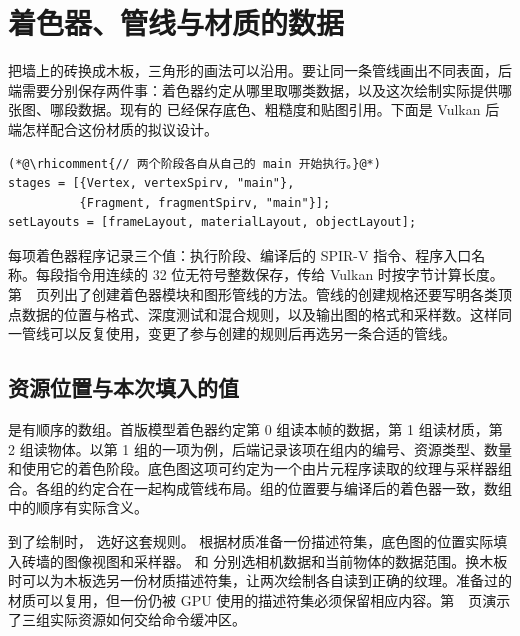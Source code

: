 \clearpage
\section{着色器、管线与材质的数据}\label{sec:data-pipeline}
把墙上的砖换成木板，三角形的画法可以沿用。要让同一条管线画出不同表面，后端需要分别保存两件事：着色器约定从哪里取哪类数据，以及这次绘制实际提供哪张图、哪段数据。现有的  已经保存底色、粗糙度和贴图引用。下面是 Vulkan 后端怎样配合这份材质的拟议设计。

\begin{lstlisting}
(*@\rhicomment{// 两个阶段各自从自己的 main 开始执行。}@*)
stages = [{Vertex, vertexSpirv, "main"},
          {Fragment, fragmentSpirv, "main"}];
setLayouts = [frameLayout, materialLayout, objectLayout];
\end{lstlisting}

每项着色器程序记录三个值：执行阶段、编译后的 SPIR-V 指令、程序入口名称。每段指令用连续的 32 位无符号整数保存，传给 Vulkan 时按字节计算长度。第~\pageref{sec:shader-api}~页列出了创建着色器模块和图形管线的方法。管线的创建规格还要写明各类顶点数据的位置与格式、深度测试和混合规则，以及输出图的格式和采样数。这样同一管线可以反复使用，变更了参与创建的规则后再选另一条合适的管线。

\subsection{资源位置与本次填入的值}
 是有顺序的数组。首版模型着色器约定第 0 组读本帧的数据，第 1 组读材质，第 2 组读物体。以第 1 组的一项为例，后端记录该项在组内的编号、资源类型、数量和使用它的着色阶段。底色图这项可约定为一个由片元程序读取的纹理与采样器组合。各组的约定合在一起构成管线布局。组的位置要与编译后的着色器一致，数组中的顺序有实际含义。

到了绘制时， 选好这套规则。 根据材质准备一份描述符集，底色图的位置实际填入砖墙的图像视图和采样器。 和  分别选相机数据和当前物体的数据范围。换木板时可以为木板选另一份材质描述符集，让两次绘制各自读到正确的纹理。准备过的材质可以复用，但一份仍被 GPU 使用的描述符集必须保留相应内容。第~\pageref{sec:bind-api}~页演示了三组实际资源如何交给命令缓冲区。

